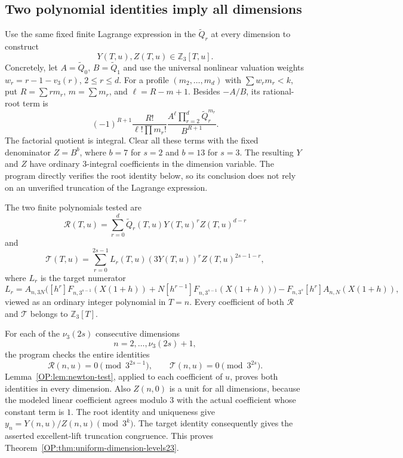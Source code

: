 \documentclass[11pt,a4paper]{article}
\theoremstyle{definition}\newtheorem{definition}[theorem]{Definition}
\theoremstyle{remark}\newtheorem{remark}[theorem]{Remark}
\numberwithin{equation}{section}
\begin{document}
\subsection{Two polynomial identities imply all dimensions}
Use the same fixed finite Lagrange expression in the
$\widetilde Q_r$ at every dimension to construct
\[
 Y(T,u),Z(T,u)\in\mathbb Z_3[T,u].
\]
Concretely, let $A=\widetilde Q_0$, $B=\widetilde Q_1$ and use the
universal nonlinear valuation weights
$w_r=r-1-v_3(r)$, $2\leq r\leq d$.
For a profile $(m_2,\ldots,m_d)$ with
$\sum w_rm_r<k$, put $R=\sum rm_r$, $m=\sum m_r$, and
$\ell=R-m+1$.  Besides $-A/B$, its rational-root term is
\[
 (-1)^{R+1}\frac{R!}{\ell!\prod m_r!}
       \frac{A^\ell\prod_{r=2}^d\widetilde Q_r^{m_r}}{B^{R+1}}.
\]
The factorial quotient is integral.  Clear all these terms with the
fixed denominator $Z=B^b$, where $b=7$ for $s=2$ and $b=13$ for $s=3$.
The resulting $Y$ and $Z$ have ordinary $3$-integral coefficients in
the dimension variable.  The program directly verifies the root
identity below, so its conclusion does not rely on an unverified
truncation of the Lagrange expression.

The two finite polynomials tested are
\[
 \mathcal R(T,u)=\sum_{r=0}^d
       \widetilde Q_r(T,u)Y(T,u)^rZ(T,u)^{d-r}
\]
and
\[
 \mathcal T(T,u)=\sum_{r=0}^{2s-1}
       L_r(T,u)(3Y(T,u))^rZ(T,u)^{2s-1-r},
\]
where $L_r$ is the target numerator
\[
 L_r=A_{n,3N}\bigl([h^r]F_{n,3^{s-1}}(X(1+h))
       +N[h^{r-1}]F_{n,3^{s-1}}(X(1+h))\bigr)
       -F_{n,3^s}[h^r]A_{n,N}(X(1+h)),
\]
viewed as an ordinary integer polynomial in $T=n$.
Every coefficient of both $\mathcal R$ and $\mathcal T$ belongs to
$\mathbb Z_3[T]$.

For each of the $\nu_3(2s)$ consecutive dimensions
\[
 n=2,\ldots,\nu_3(2s)+1,
\]
the program checks the entire identities
\[
 \mathcal R(n,u)=0\pmod{3^{2s-1}},\qquad
 \mathcal T(n,u)=0\pmod{3^{2s}}.
\]
Lemma~\ref{OP:lem:newton-test}, applied to each coefficient of $u$,
proves both identities in every dimension.  Also $Z(n,0)$ is a unit
for all dimensions, because the modeled linear coefficient agrees
modulo $3$ with the actual coefficient whose constant term is $1$.
The root identity and uniqueness give $y_n=Y(n,u)/Z(n,u)\pmod{3^k}$.
The target identity consequently gives the asserted excellent-lift
truncation congruence.  This proves
Theorem~\ref{OP:thm:uniform-dimension-levels23}.
\end{document}

